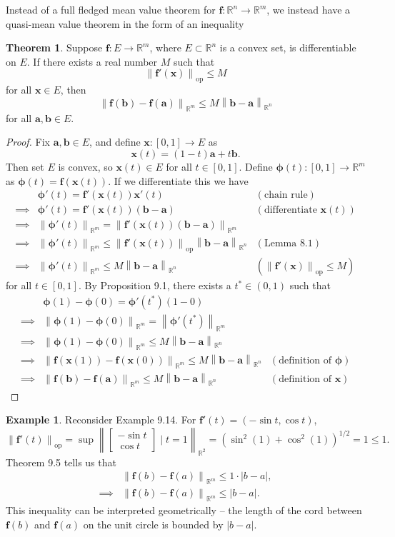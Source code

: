 \documentclass{article}
\newcommand{\R}{\mathbb{R}}
\newcommand{\x}{\mathbf{x}}
\newcommand{\f}{\mathbf{f}}
\renewcommand{\b}{\mathbf{b}}
\renewcommand{\a}{\mathbf{a}}
\newcommand{\norm}[1]{\left\lVert#1\right\rVert}
\newcommand{\normop}[1]{\left\lVert#1\right\rVert_\text{op}}
\theoremstyle{definition}
\newtheorem{theorem}{Theorem}[section]
\newtheorem{example}{Example}[section]
\begin{document}
Instead of a full fledged mean value theorem for $ \f:\R^n\to\R^m $, we instead have a quasi-mean value theorem in the form of an inequality
\begin{theorem}
	Suppose $ \f:E\to\R^m $, where $ E\subset \R^n $ is a convex set, is differentiable on $ E $. If there exists a real number $ M $ such that $$ \normop{\f'(\x)}\le M$$ for all $ \x\in E $, then $$ \norm{\f(\b)-\f(\a)}_{\R^m} \le M\norm{\b-\a}_{\R^n}$$ for all $ \a,\b\in E $. 
\end{theorem}
\begin{proof}
	Fix $ \a,\b\in E $, and define $ \x:[0,1]\to E $ as $$ \x(t)= (1-t)\a + t\b . $$ Then set $ E $ is convex, so $ \x(t)\in E $ for all $ t\in[0,1] $. Define $ \boldsymbol{\phi}(t):[0,1]\to \R^m $ as $\boldsymbol{\phi}(t)=\f(\x(t)) $. If we differentiate this we have 
	\begin{align*}
	&	\boldsymbol{\phi}'(t) = \f'(\x(t))\x'(t) & (\text{chain rule})\\
	\implies & 	\boldsymbol{\phi}'(t) = \f'(\x(t))(\b-\a) & (\text{differentiate }\x(t))\\
	\implies & \norm{\boldsymbol{\phi}'(t)}_{\R^m} = \norm{\f'(\x(t))(\b-\a) }_{\R^m}\\ 
	 \implies &\norm{\boldsymbol{\phi}'(t)}_{\R^m} \le \normop{\f'(\x(t))}\norm{\b-\a }_{\R^n} & (\text{Lemma }8.1)\\ \implies &\norm{\boldsymbol{\phi}'(t)}_{\R^m} \le M\norm{\b-\a }_{\R^n} & \left(\normop{\f'(\x)}\le M\right)
	\end{align*}
for all $ t\in[0,1] $. By Proposition 9.1, there exists a $ t^*\in (0,1) $ such that 
\begin{align*}
	&\boldsymbol{\phi}(1)-\boldsymbol{\phi}(0)= \boldsymbol{\phi}'(t^*)(1 - 0) \\ \implies& \norm{\boldsymbol{\phi}(1)-\boldsymbol{\phi}(0)}_{\R^m}= \norm{\boldsymbol{\phi}'(t^*)}_{\R^m}\\
	\implies& \norm{\boldsymbol{\phi}(1)-\boldsymbol{\phi}(0)}_{\R^m}\le  M\norm{\b-\a}_{\R^n}\\
	\implies& \norm{\f(\x(1)) - \f(\x(0)) }_{\R^m} \le  M\norm{\b-\a}_{\R^n}&(\text{definition of }\boldsymbol\phi) \\
	\implies & \norm{\f(\b) - \f(\a) }_{\R^m} \le  M\norm{\b-\a}_{\R^n}&(\text{definition of }\x)
\end{align*}
\end{proof}
\begin{example}
	Reconsider Example 9.14. For $ \f'(t)=(-\sin t,\cos t) $, $$\normop{\f'(t)}= \sup\norm{\begin{bmatrix}
			-\sin t\\ \cos t
	\end{bmatrix} \mid t = 1}_{\R^2} = (\sin^2(1)+\cos^2(1))^{1/2} = 1  \le 1 .$$
Theorem 9.5 tells us that \begin{align*}
	&\norm{\f(b)-\f(a)}_{\R^m} \le 1\cdot |b-a| ,\\
	\implies & \norm{\f(b)-\f(a)}_{\R^m} \le  |b-a|. 
\end{align*}
This inequality can be interpreted geometrically -- the length of the cord between $ \f(b) $ and $ \f(a) $ on the unit circle is bounded by $ |b-a| $. 

\end{example}
\end{document}

